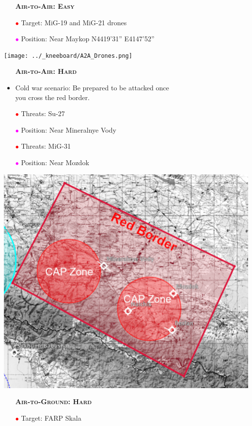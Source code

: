 \documentclass[a4paper,12pt,dvipsnames]{letter}
\newcommand{\Deg}{\textdegree{}}
\newcommand{\DMS}[3]{#1\Deg#2'#3''}
\newcommand{\myHead}[1]{{\LARGE\textsc{\textbf{#1}}}}
\newcommand{\ri}{\textcolor{Red}{$\bullet$\;}}
\newcommand{\mi}{\textcolor{Magenta}{$\bullet$\;}}
\begin{document}
{\newpage
\begin{itemize}
 \item[] \myHead{Air-to-Air: Easy}
 \item[\ri] Target: MiG-19 and MiG-21 drones
 \item[\mi] Position: Near Maykop N\DMS{44}{19}{31} E\DMS{41}{47}{52}
\end{itemize}
\begin{center}
 \texttt{[image: ../\_kneeboard/A2A\_Drones.png]}
\end{center}
%
\newpage
\begin{itemize}
 \item[] \myHead{Air-to-Air: Hard}
 \item Cold war scenario: Be prepared to be attacked once\\you cross the red border.
 \item[\ri] Threats: Su-27
 \item[\mi] Position: Near Mineralnye Vody
 \item[\ri] Threats: MiG-31
 \item[\mi] Position: Near Mozdok
\end{itemize}
\begin{center}
 \includegraphics[width=0.7\linewidth]{../_kneeboard/A2A_Border.png}
\end{center}
%
\newpage
\begin{itemize}
 \item[] \myHead{Air-to-Ground: Hard}
 \item[\ri] Target: FARP Skala

\end{itemize}}
\end{document}
